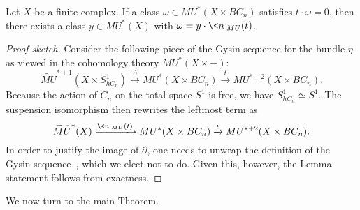 \begin{lemma}\label{QuillensGysinFact}
Let \(X\) be a finite complex.  If a class \(\omega \in MU^*(X \times BC_n)\) satisfies \(t \cdot \omega = 0\), then there exists a class \(y \in MU^*(X)\) with \(\omega = y \cdot \<n\>_{MU}(t)\).
\end{lemma}
\begin{proof}[Proof sketch]
Consider the following piece of the Gysin sequence for the bundle \(\eta\) as viewed in the cohomology theory \(MU^*(X \times -)\): \[\widetilde{MU}^{*+1}(X \times S^1_{hC_n}) \xrightarrow{\partial} MU^*(X \times BC_n) \xrightarrow{t} MU^{*+2}(X \times BC_n).\]  Because the action of \(C_n\) on the total space \(S^1\) is free, we have \(S^1_{hC_n} \simeq S^1\).  The suspension isomorphism then rewrites the leftmost term as \[\widetilde{MU}^*(X) \xrightarrow{\<n\>_{MU}(t)} MU^*(X \times BC_n) \xrightarrow{t} MU^{*+2}(X \times BC_n).\]  In order to justify the image of \(\partial\), one needs to unwrap the definition of the Gysin sequence~\cite[Equation 4.7, Proposition 4.2]{Quillen}, which we elect not to do.  Given this, however, the Lemma statement follows from exactness.
\end{proof}

We now turn to the main Theorem.


